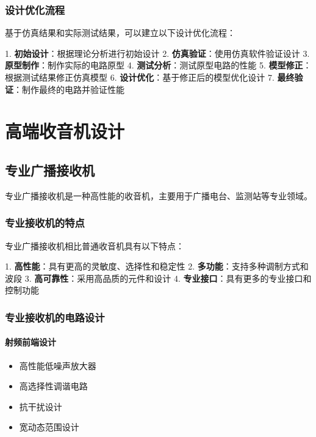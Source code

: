 \documentclass[12pt,UTF8]{ctexbook}
\begin{document}
\section{设计优化流程}

基于仿真结果和实际测试结果，可以建立以下设计优化流程：

1. \textbf{初始设计}：根据理论分析进行初始设计
2. \textbf{仿真验证}：使用仿真软件验证设计
3. \textbf{原型制作}：制作实际的电路原型
4. \textbf{测试分析}：测试原型电路的性能
5. \textbf{模型修正}：根据测试结果修正仿真模型
6. \textbf{设计优化}：基于修正后的模型优化设计
7. \textbf{最终验证}：制作最终的电路并验证性能

\part{高端收音机设计}

\chapter{专业广播接收机}

专业广播接收机是一种高性能的收音机，主要用于广播电台、监测站等专业领域。

\section{专业接收机的特点}

专业广播接收机相比普通收音机具有以下特点：

1. \textbf{高性能}：具有更高的灵敏度、选择性和稳定性
2. \textbf{多功能}：支持多种调制方式和波段
3. \textbf{高可靠性}：采用高品质的元件和设计
4. \textbf{专业接口}：具有更多的专业接口和控制功能

\section{专业接收机的电路设计}

\subsection{射频前端设计}\begin{itemize}
  \item 高性能低噪声放大器
  \item 高选择性调谐电路
  \item 抗干扰设计
  \item 宽动态范围设计\end{itemize}
\end{document}
